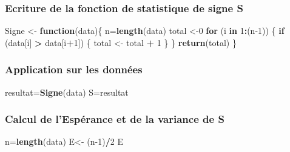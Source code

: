\documentclass[
  12pt,
]{article}
\newenvironment{Shaded}{\begin{snugshade}}{\end{snugshade}}
\newcommand{\ControlFlowTok}[1]{\textcolor[rgb]{0.13,0.29,0.53}{\textbf{#1}}}
\newcommand{\DecValTok}[1]{\textcolor[rgb]{0.00,0.00,0.81}{#1}}
\newcommand{\FunctionTok}[1]{\textcolor[rgb]{0.13,0.29,0.53}{\textbf{#1}}}
\newcommand{\NormalTok}[1]{#1}
\newcommand{\OtherTok}[1]{\textcolor[rgb]{0.56,0.35,0.01}{#1}}
\newcommand{\SpecialCharTok}[1]{\textcolor[rgb]{0.81,0.36,0.00}{\textbf{#1}}}
\begin{document}
\subsubsection{Ecriture de la fonction de statistique de signe
S}\label{ecriture-de-la-fonction-de-statistique-de-signe-s}

\begin{Shaded}
\begin{Highlighting}[]
\NormalTok{Signe }\OtherTok{\textless{}{-}} \ControlFlowTok{function}\NormalTok{(data)\{}
\NormalTok{n}\OtherTok{=}\FunctionTok{length}\NormalTok{(data)}
\NormalTok{total }\OtherTok{\textless{}{-}}\DecValTok{0}
\ControlFlowTok{for}\NormalTok{ (i }\ControlFlowTok{in} \DecValTok{1}\SpecialCharTok{:}\NormalTok{(n}\DecValTok{{-}1}\NormalTok{)) \{}
\ControlFlowTok{if}\NormalTok{ (data[i] }\SpecialCharTok{\textgreater{}}\NormalTok{ data[i}\SpecialCharTok{+}\DecValTok{1}\NormalTok{]) \{}
\NormalTok{total }\OtherTok{\textless{}{-}}\NormalTok{ total }\SpecialCharTok{+} \DecValTok{1}
\NormalTok{\}}
\NormalTok{\}}
\FunctionTok{return}\NormalTok{(total)}
\NormalTok{\}}
\end{Highlighting}
\end{Shaded}

\subsubsection{Application sur les
données}\label{application-sur-les-donnuxe9es}

\begin{Shaded}
\begin{Highlighting}[]
\NormalTok{resultat}\OtherTok{=}\FunctionTok{Signe}\NormalTok{(data)}
\NormalTok{S}\OtherTok{=}\NormalTok{resultat}
\end{Highlighting}
\end{Shaded}

\subsubsection{Calcul de l'Espérance et de la variance de
S}\label{calcul-de-lespuxe9rance-et-de-la-variance-de-s}

\begin{Shaded}
\begin{Highlighting}[]
\NormalTok{n}\OtherTok{=}\FunctionTok{length}\NormalTok{(data)}
\NormalTok{E}\OtherTok{\textless{}{-}}\NormalTok{ (n}\DecValTok{{-}1}\NormalTok{)}\SpecialCharTok{/}\DecValTok{2}
\NormalTok{E}
\end{Highlighting}
\end{Shaded}
\end{document}
